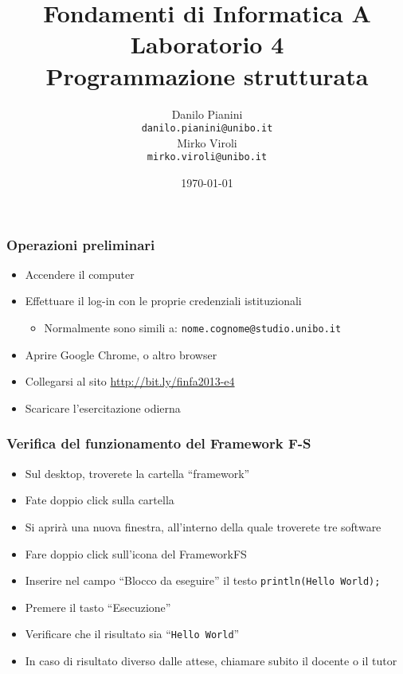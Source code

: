 \documentclass{beamer}
\begin{document}
\title[Lab1 - FV]{Fondamenti di Informatica A \\ Laboratorio 4 \\ Programmazione strutturata}
\author[Danilo Pianini]{Danilo Pianini\\\texttt{danilo.pianini@unibo.it} \\ \vspace{3pt} Mirko Viroli\\\texttt{mirko.viroli@unibo.it} }
\date[\today]{\today}

\frame{\titlepage} 

\begin{frame}
\frametitle{Operazioni preliminari}
\begin{itemize}
 \item Accendere il computer
 \item Effettuare il log-in con le proprie credenziali istituzionali
  \begin{itemize}
    \item Normalmente sono simili a: \texttt{nome.cognome@studio.unibo.it}
  \end{itemize}
 \item Aprire Google Chrome, o altro browser
 \item Collegarsi al sito \url{http://bit.ly/finfa2013-e4}
 \item Scaricare l'esercitazione odierna
\end{itemize}
\end{frame}

\begin{frame}
\frametitle{Verifica del funzionamento del Framework F-S}
\begin{itemize}
 \item Sul desktop, troverete la cartella ``framework''
 \item Fate doppio click sulla cartella
 \item Si aprirà una nuova finestra, all'interno della quale troverete tre software
 \item Fare doppio click sull'icona del FrameworkFS
 \item Inserire nel campo ``Blocco da eseguire'' il testo \texttt{println(\textquotedbl{}Hello World\textquotedbl{});}
 \item Premere il tasto ``Esecuzione''
 \item Verificare che il risultato sia ``\texttt{Hello World}''
 \item In caso di risultato diverso dalle attese, chiamare subito il docente o il tutor
\end{itemize}
\end{frame}
\end{document}
